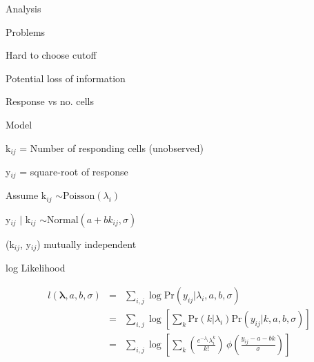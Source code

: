 \documentclass[aspectratio=169,12pt,t]{beamer}
\begin{document}
\begin{frame}[c]{Analysis}
\end{frame}



\begin{frame}{Problems}
  \bbi
\item Hard to choose cutoff
\item Potential loss of information
  \ei
\end{frame}


\begin{frame}{Response vs no. cells}
\end{frame}


\begin{frame}[c]{Model}

  \vspace{3mm}

  k$_{ij}$ = Number of responding cells (unobserved)

  y$_{ij}$ = square-root of response

  \vspace{10mm}

  Assume {\hilit k$_{ij}$ $\sim \text{Poisson}(\lambda_i)$}

  \vspace{2mm}

  \hspace*{15mm} {\hilit y$_{ij}$ $|$ k$_{ij}$ $\sim \text{Normal}(a +
    b k_{ij}, \sigma)$}

  \vspace{2mm}

  \hspace*{15mm} {\hilit (k$_{ij}$, y$_{ij}$) mutually independent}

  \vspace{5mm}


\end{frame}




\begin{frame}[c]{log Likelihood}


  \begin{eqnarray*}
    l(\boldsymbol{\lambda}, a, b, \sigma)
       & = & \sum_{i,j} \log \text{Pr}(y_{ij} | \lambda_i, a, b, \sigma) \\
    & = & \sum_{i,j} \log \left[ \sum_k
      \text{Pr}(k | \lambda_i)
      \text{Pr}(y_{ij} | k, a, b, \sigma)
      \right] \\
    & = & \sum_{i,j} \log \left[ \sum_k
      \left(\frac{e^{-\lambda_i} \lambda_i^k}{ k! }\right) \, \phi\left( \frac{y_{ij} - a -
        bk}{\sigma} \right)
      \right]
  \end{eqnarray*}

\end{frame}
\end{document}
